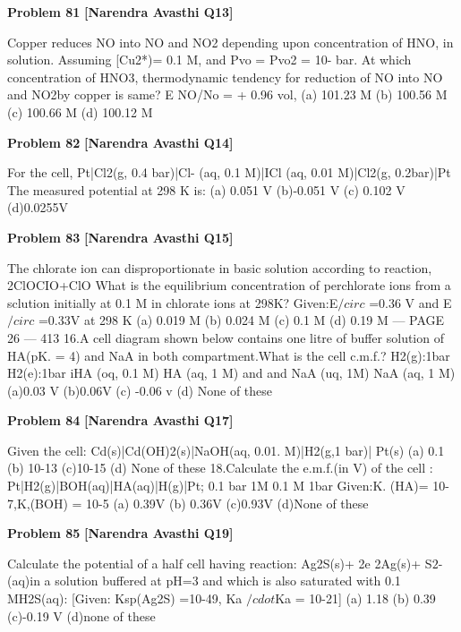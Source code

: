 \begin{problembox}
\textbf{Problem 81} \hfill \textbf{[Narendra Avasthi Q13]}
\label{q:ext-narendra_avasthi_all_questions-81}

Copper reduces NO into NO and NO2 depending upon concentration of HNO, in solution.
Assuming [Cu2*)= 0.1 M, and Pvo = Pvo2 = 10- bar. At which concentration of HNO3,
thermodynamic tendency for reduction of NO into NO and NO2by copper is same?
E
NO/No = + 0.96 vol,
(a) 101.23 M
(b) 100.56 M
(c) 100.66 M
(d) 100.12 M
\end{problembox}

\begin{problembox}
\textbf{Problem 82} \hfill \textbf{[Narendra Avasthi Q14]}
\label{q:ext-narendra_avasthi_all_questions-82}

For the cell, Pt|Cl2(g, 0.4 bar)|Cl- (aq, 0.1 M)|ICl (aq, 0.01 M)|Cl2(g, 0.2bar)|Pt
The measured potential at 298 K is:
(a) 0.051 V
(b)-0.051 V
(c) 0.102 V
(d)0.0255V
\end{problembox}

\begin{problembox}
\textbf{Problem 83} \hfill \textbf{[Narendra Avasthi Q15]}
\label{q:ext-narendra_avasthi_all_questions-83}

The chlorate ion can disproportionate in basic solution according to reaction,
2ClOCIO+ClO
What is the equilibrium concentration of perchlorate ions from a sclution initially at 0.1 M in
chlorate ions at 298K?
Given:E$/circ$
=0.36 V and E$/circ$
=0.33V at 298 K
(a) 0.019 M
(b) 0.024 M
(c) 0.1 M
(d) 0.19 M
--- PAGE 26 ---
413
16.A cell diagram shown below contains one litre of buffer solution of HA(pK. = 4) and NaA in
both compartment.What is the cell c.m.f.?
H2(g):1bar
H2(e):1bar
iHA (oq, 0.1 M)
HA (aq, 1 M)
and
and
NaA (uq, 1M)
NaA (aq, 1 M)
(a)0.03 V
(b)0.06V
(c) -0.06 v
(d) None of these
\end{problembox}

\begin{problembox}
\textbf{Problem 84} \hfill \textbf{[Narendra Avasthi Q17]}
\label{q:ext-narendra_avasthi_all_questions-84}

Given the cell: Cd(s)|Cd(OH)2(s)|NaOH(aq, 0.01. M)|H2(g,1 bar)| Pt(s)
(a) 0.1
(b) 10-13
(c)10-15
(d) None of these
18.Calculate the e.m.f.(in V) of the cell :
Pt|H2(g)|BOH(aq)|HA(aq)|H(g)|Pt;
0.1 bar 1M
0.1 M
1bar
Given:K. (HA)= 10-7,K,(BOH) = 10-5
(a) 0.39V
(b) 0.36V
(c)0.93V
(d)None of these
\end{problembox}

\begin{problembox}
\textbf{Problem 85} \hfill \textbf{[Narendra Avasthi Q19]}
\label{q:ext-narendra_avasthi_all_questions-85}

Calculate the potential of a half cell having reaction: Ag2S(s)+ 2e 2Ag(s)+ S$2$- (aq)in
a solution buffered at pH=3 and which is also saturated with 0.1 MH2S(aq):
[Given: Ksp(Ag2S) =10-49, Ka $/cdot$Ka = 10-21]
(a) 1.18
(b) 0.39
(c)-0.19 V
(d)none of these
\end{problembox}

